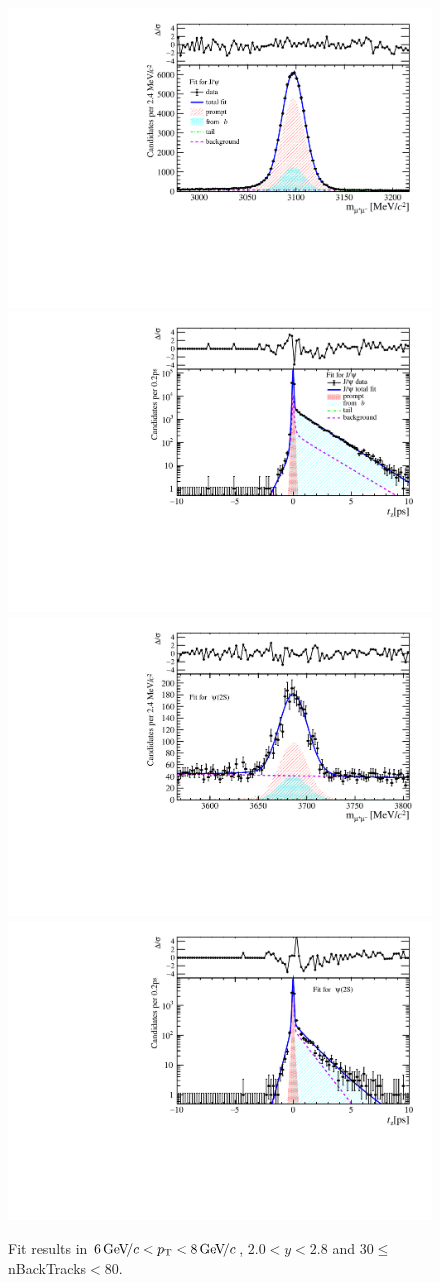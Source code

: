 \begin{figure}[H]
\begin{center}
\includegraphics[width=0.47\linewidth]{pdf/Jpsi/drawmassB/n5y1pt4.pdf}
\includegraphics[width=0.47\linewidth]{pdf/Jpsi/2DFitB/n5y1pt4.pdf}
\vspace*{-0.5cm}
\includegraphics[width=0.47\linewidth]{pdf/Psi2S/drawmassB/n5y1pt4.pdf}
\includegraphics[width=0.47\linewidth]{pdf/Psi2S/2DFitB/n5y1pt4.pdf}
\vspace*{-0.5cm}
\end{center}
\caption{Fit results in $6\text{\,Ge\kern -0.1em V\!/}c<p_{\mathrm{T}}<8\text{\,Ge\kern -0.1em V\!/}c$, $2.0<y<2.8$ and 30$\leq$nBackTracks$<$80.}
\label{Fitn5y1pt4}
\end{figure}
